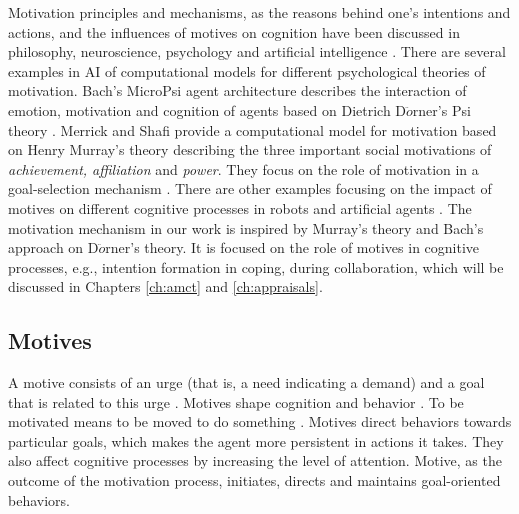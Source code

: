 \documentclass[12pt]{report}
\begin{document}
Motivation principles and mechanisms, as the reasons behind one's intentions and
actions, and the influences of motives on cognition have been discussed in
philosophy, neuroscience, psychology and artificial intelligence
\cite{bach:motivaitional-system-ai, berridge:motivation-concepts-neuroscience,
brody:motivation-goal-action, simon:motivation-emotion-cognition,
sloman:motivation}. There are several examples in AI of computational models for
different psychological theories of motivation. Bach's MicroPsi agent
architecture describes the interaction of emotion, motivation and cognition of
agents based on Dietrich D$\ddot{o}$rner's Psi theory
\cite{bach:micropsi-agent-architecture, bach:psi, bach:motivaitional-system-ai,
bach:next-generation-micropsi}. Merrick and Shafi provide a computational model
for motivation based on Henry Murray's theory
\cite{murray:personality-exploration} describing the three important social
motivations of \textit{achievement, affiliation} and \textit{power}. They focus
on the role of motivation in a goal-selection mechanism
\cite{merrick:acheievement-affiliation-power}. There are other examples focusing
on the impact of motives on different cognitive processes in robots and
artificial agents \cite{breazeal:motivation-regulating-hri,
dolores:socially-emotional, deSevin:motivational-model-agent,
sellers:comprehensive-emotion-theory, velasquez:emotions-motivations-agents,
wright:implementation-agent-architecture}. The motivation mechanism in our work
is inspired by Murray's theory and Bach's approach on D$\ddot{o}$rner's theory.
It is focused on the role of motives in cognitive processes, e.g.,
intention formation in coping, during collaboration, which will be discussed in
Chapters \ref{ch:amct} and \ref{ch:appraisals}.

\subsection{Motives}

A motive consists of an urge (that is, a need indicating a demand) and a goal
that is related to this urge \cite{bach:psi}. Motives shape cognition and
behavior \cite{schultheiss:implicit-motive}. To be motivated means to be moved
to do something \cite{ryan:intrinsic-extrinsic-motivations}. Motives direct
behaviors towards particular goals, which makes the agent more persistent in
actions it takes. They also affect cognitive processes by increasing the level
of attention. Motive, as the outcome of the motivation process, initiates,
directs and maintains goal-oriented behaviors.
\end{document}
